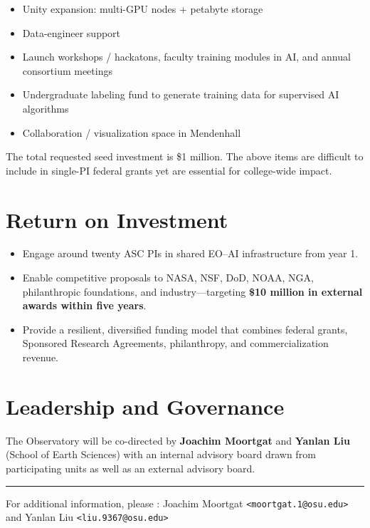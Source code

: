 \documentclass[11pt]{article}
\newcommand{\ylcom}[1]{{\color{blue}(YL: #1)}}
\begin{document}
\begin{itemize}[leftmargin=*,itemsep=2pt]
\item Unity expansion: multi-GPU nodes + petabyte storage  
\item Data-engineer support 
\item Launch workshops / hackatons, faculty training modules in AI, and annual consortium meetings  
\item Undergraduate labeling fund to generate training data for supervised AI algorithms
\item Collaboration / visualization space in Mendenhall  
\end{itemize}

The total requested seed investment is  \$1 million.  The above items are difficult to include in single-PI federal grants yet are essential for college-wide impact.

\section*{Return on Investment}

\begin{itemize}[leftmargin=*,itemsep=3pt]
\item Engage around twenty ASC PIs in shared EO–AI infrastructure from year 1.  
\item Enable competitive proposals to NASA, NSF, DoD, NOAA, NGA, philanthropic foundations, and industry—targeting \textbf{\$10  million in external awards within five years}.  
\item Provide a resilient, diversified funding model that combines federal grants, Sponsored Research Agreements, philanthropy, and commercialization revenue.  
\end{itemize}

\section*{Leadership and Governance}

The Observatory will be co-directed by \textbf{Joachim Moortgat} and \textbf{Yanlan Liu} (School of Earth Sciences) with an internal advisory board drawn from participating units as well as an external advisory board.  %



\vspace{3em}
\hrule
\vspace{0.5em}

\small
For additional information, please :  
Joachim Moortgat \texttt{<moortgat.1@osu.edu>} and Yanlan Liu \texttt{<liu.9367@osu.edu>}
\end{document}
